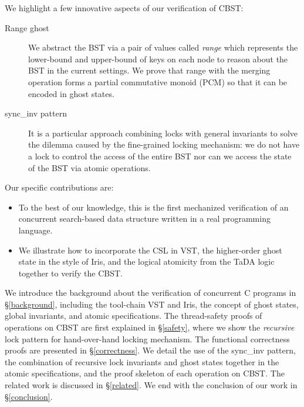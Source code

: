 We highlight a few innovative aspects of our verification of CBST:
\begin{description}
\item [Range ghost] We abstract the BST via a pair of values
called \emph{range} which represents the lower-bound and upper-bound
of keys on each node to reason about the BST in the current
settings. We prove that range with the merging operation forms a
partial commutative monoid (PCM) so that it can be encoded in ghost
states.

\item [\textsf{sync\_inv} pattern] It is a particular approach
combining locks with general invariants to solve the dilemma caused by
the fine-grained locking mechanism: we do not have a lock to control
the access of the entire BST nor can we access the state of the BST
via atomic operations.
\end{description}



Our specific contributions are:
\begin{itemize}
\item To the best of our knowledge, this is the first mechanized
verification of an concurrent search-based data structure written in a
real programming language. %

\item We illustrate how to incorporate the CSL in VST, the higher-order
ghost state in the style of Iris, and the logical atomicity from the
TaDA logic together to verify the CBST.
\end{itemize}

We introduce the background about the verification of concurrent C
programs in \S\ref{background}, including the tool-chain VST and Iris,
the concept of ghost states, global invariants, and atomic
specifications. The thread-safety proofs of operations on CBST are
first explained in \S\ref{safety}, where we show the \emph{recursive}
lock pattern for hand-over-hand locking mechanism. The functional
correctness proofs are presented in \S\ref{correctness}. We detail the
use of the \textsf{sync\_inv} pattern, the combination of recursive
lock invariants and ghost states together in the atomic
specifications, and the proof skeleton of each operation on CBST. The
related work is discussed in \S\ref{related}. We end with the
conclusion of our work in \S\ref{conclusion}.

